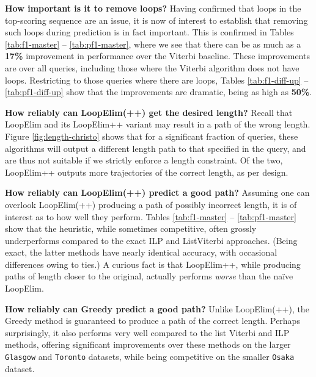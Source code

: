 \textbf{How important is it to remove loops?}
Having confirmed that loops in the top-scoring sequence are an issue,
it is now of interest to establish that removing such loops during prediction is in fact important.
This is confirmed in Tables \ref{tab:f1-master} -- \ref{tab:pf1-master},
where we see that there can be as much as a \textbf{17\%} improvement in performance over the {\sc Viterbi} baseline.
These improvements are over all queries, including those where the {\sc Viterbi} algorithm does not have loops.
Restricting to those queries where there are loops,
Tables \ref{tab:f1-diff-up} -- \ref{tab:pf1-diff-up}
show that the improvements are dramatic, being as high as \textbf{50\%}.

\textbf{How reliably can {\sc LoopElim(++)} get the desired length?}
Recall that
{\sc LoopElim} and its {\sc LoopElim++} variant
may result in a path of the wrong length.
Figure \ref{fig:length-christo} shows that for a significant fraction of queries,
these algorithms
will output a different length path to that specified in the query,
and are thus not suitable if we strictly enforce a length constraint.
Of the two, {\sc LoopElim++} outputs more trajectories of the correct length, as per design.

\textbf{How reliably can {\sc LoopElim(++)} predict a good path?}
Assuming one can overlook {\sc LoopElim(++)} producing a path of possibly incorrect length,
it is of interest as to how well
they perform.
Tables \ref{tab:f1-master} -- \ref{tab:pf1-master} show that the heuristic, while sometimes competitive, often
grossly underperforms compared to the exact {\sc ILP} and {\sc ListViterbi} approaches.
(Being exact, the latter methods have nearly identical accuracy, with occasional differences owing to ties.)
A curious fact is that {\sc LoopElim++}, while producing paths of length closer to the original, actually performs \emph{worse} than the na\"{i}ve {\sc LoopElim}.


\textbf{How reliably can {\sc Greedy} predict a good path?}
Unlike {\sc LoopElim(++)}, the {\sc Greedy} method is guaranteed to produce a path of the correct length.
Perhaps surprisingly, it also performs very well compared to the list Viterbi and ILP methods, 
offering significant improvements over these methods on the larger {\tt Glasgow} and {\tt Toronto} datasets,
while being competitive on the smaller {\tt Osaka} dataset.


